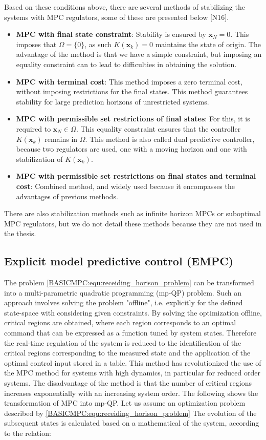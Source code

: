 Based on these conditions above, there are several methods of stabilizing the systems with MPC regulators, some of these are presented below [N16].

\begin{itemize}
	\item \textbf{MPC with final state constraint}: Stability is ensured by $\textbf{x}_N=0$. This imposes that $\Omega=\{0\}$, as such $K(\textbf{x}_k)=0$ maintains the state of origin. The advantage of the method is that we have a simple constraint, but imposing an equality constraint can to lead to difficulties in obtaining the solution.
	\item \textbf{MPC with terminal cost}: This method imposes a zero terminal cost, without imposing restrictions
for the final states. This method guarantees stability for large prediction horizons
of unrestricted systems.
	\item \textbf{MPC with permissible set restrictions of final states}: For this, it is required to $\textbf{x}_N\in\Omega$. This equality constraint ensures that the controller $K(\textbf{x}_k)$ remains in $\Omega$. This method is also called dual predictive controller, because two regulators are used, one with a moving horizon and one with stabilization of $K(\textbf{x}_k)$.
	\item \textbf{MPC with permissible set restrictions on final states and terminal cost}: Combined method, and widely used because it encompasses the advantages of previous methods.
\end{itemize}

There are also stabilization methods such as infinite horizon MPCs or suboptimal MPC regulators, but we do not detail these methods because they are not used in the thesis.

\subsection{Explicit model predictive control (EMPC)}\label{BASICCSR:sec:EMPC}

The problem \ref{BASICMPC:equ:receiding_horison_problem} can be transformed into a multi-parametric quadratic programming (mp-QP) problem. Such an approach involves solving the problem "offline", i.e. explicitly for the defined state-space with considering given constraints. By solving the optimization offline, critical regions are obtained, where each region corresponds to an optimal command that can be expressed as a function tuned by system states. Therefore the real-time regulation of the system is reduced to the identification of the critical regions corresponding to the measured state and the application of the optimal control input stored in a table. This method has revolutionized the use of the MPC method for systems with high dynamics, in particular for reduced order systems. The disadvantage of the method is that the number of critical regions increases exponentially with an increasing system order. The following shows the transformation of MPC into
mp-QP.
Let us assume an optimization problem described by \ref{BASICMPC:equ:receiding_horison_problem} The evolution of the subsequent states is calculated based on a mathematical of the system, according to the relation:

